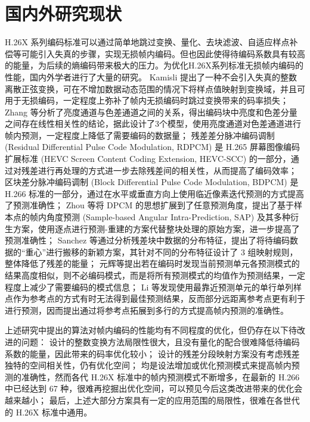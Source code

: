 \section{国内外研究现状}
H.26X 系列编码标准可以通过简单地跳过变换、量化、去块滤波、自适应样点补偿等可能引入失真的步骤，实现无损帧内编码。但也因此使得待编码系数具有较高的能量，为后续的熵编码带来极大的压力。为优化H.26X系列标准无损帧内编码的性能，国内外学者进行了大量的研究。
Kamisli 提出了一种不会引入失真的整数离散正弦变换，可在不增加数据动态范围的情况下将样点值映射到变换域，并且可用于无损编码，一定程度上弥补了帧内无损编码时跳过变换带来的码率损失；
Zhang 等分析了亮度通道与色差通道之间的关系，得出编码块中亮度和色差分量之间存在线性相关性的结论，据此设计了3个模型，使用亮度通道对色差通道进行帧内预测，一定程度上降低了需要编码的数据量；
残差差分脉冲编码调制 (Residual Differential Pulse Code Modulation, RDPCM) 是 H.265 屏幕图像编码扩展标准 (HEVC Screen Content Coding Extension, HEVC-SCC) 的一部分，通过对残差进行再处理的方式进一步去除残差间的相关性，从而提高了编码效率；
区块差分脉冲编码调制 (Block Differential Pulse Code Modulation, BDPCM) 是 H.266 标准的一部分，通过在水平或垂直方向上使用临近像素迭代预测的方式提高了预测准确性；
Zhou 等将 DPCM 的思想扩展到了任意预测角度，提出了基于样本点的帧内角度预测 (Sample-based Angular Intra-Prediction, SAP) 及其多种衍生方案，使用逐点进行预测-重建的方案代替整块处理的原始方案，进一步提高了预测准确性；
Sanchez 等通过分析残差块中数据的分布特征，提出了将待编码数据的“重心”进行搬移的新颖方案，其针对不同的分布特征设计了 3 组映射规则，整体降低了残差的能量；
元辉等提出若在编码时发现当前预测单元各预测模式的结果高度相似，则不必编码模式，而是将所有预测模式的均值作为预测结果，一定程度上减少了需要编码的模式信息；
Li 等发现使用最靠近预测单元的单行单列样点作为参考点的方式有时无法得到最佳预测结果，反而部分远距离参考点更有利于进行预测，因而提出通过将参考点拓展到多行的方式提高帧内预测的准确性。

上述研究中提出的算法对帧内编码的性能均有不同程度的优化，但仍存在以下待改进的问题：
\cite{LosslessI2ITransformTCSVT} 设计的整数变换方法局限性很大，且没有量化的配合很难降低待编码系数的能量，因此带来的码率优化较小；
\cite{pwmResidualsPiecewiseMapping,HEVCSCCOverview} 设计的残差分段映射方案没有考虑残差独特的空间相关性，仍有优化空间；
\cite{CrossComponentPredictionCCLM,SAP-SAPE,SAP-SAP1,SAP-SAPHVSWP2DTM,SAP-SAPHV,SAP-SAP,XiDianIntraPredictionH264,EfficientMultiplelinebasedIntra} 均是设法增加或优化预测模式来提高帧内预测的准确性，然而各代 H.26X 标准中的帧内预测模式不断增多，在最新的 H.266 中已经达到 67 种，很难再挖掘出优化空间，可以预见今后这类改进带来的优化会越来越小；
最后，上述大部分方案具有一定的应用范围的局限性，很难在各世代的 H.26X 标准中通用。

